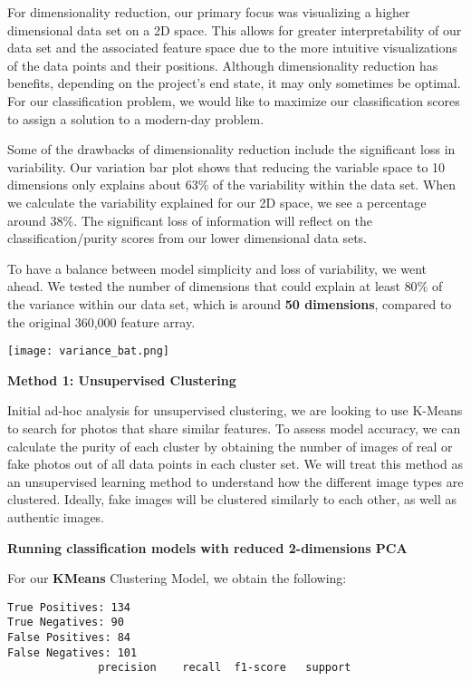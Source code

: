 \documentclass{article}
\begin{document}
\begin{titlepage}
\begin{itemize}
For dimensionality reduction, our primary focus was visualizing a higher dimensional data set on a 2D space. This allows for greater interpretability of our data set and the associated feature space due to the more intuitive visualizations of the data points and their positions. Although dimensionality reduction has benefits, depending on the project's end state, it may only sometimes be optimal. For our classification problem, we would like to maximize our classification scores to assign a solution to a modern-day problem.

Some of the drawbacks of dimensionality reduction include the significant loss in variability. Our variation bar plot shows that reducing the variable space to 10 dimensions only explains about $63\%$ of the variability within the data set. When we calculate the variability explained for our 2D space, we see a percentage around $38\%$. The significant loss of information will reflect on the classification/purity scores from our lower dimensional data sets.

To have a balance between model simplicity and loss of variability, we went ahead. We tested the number of dimensions that could explain at least $80\%$ of the variance within our data set, which is around \textbf{50 dimensions}, compared to the original 360,000 feature array.

\begin{center}
    \texttt{[image: variance\_bat.png]}
\end{center}
\newpage

    \textbf{Method 1: Unsupervised Clustering}

    Initial ad-hoc analysis for unsupervised clustering, we are looking to use K-Means to search for photos that share similar features. To assess model accuracy, we can calculate the purity of each cluster by obtaining the number of images of real or fake photos out of all data points in each cluster set. We will treat this method as an unsupervised learning method to understand how the different image types are clustered. Ideally, fake images will be clustered similarly to each other, as well as authentic images.

\textbf{Running classification models with reduced 2-dimensions PCA}

For our \textbf{KMeans} Clustering Model, we obtain the following:

\begin{verbatim}
True Positives: 134
True Negatives: 90
False Positives: 84
False Negatives: 101
              precision    recall  f1-score   support


\end{verbatim}
\end{itemize}
\end{titlepage}
\end{document}
